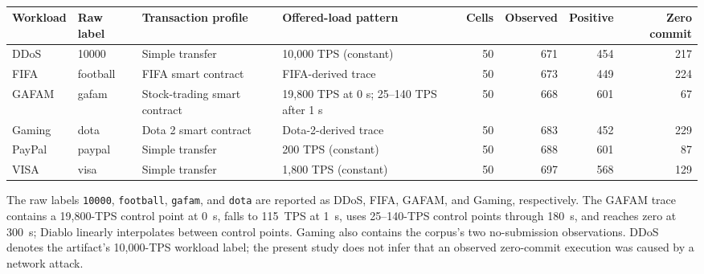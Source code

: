 \begin{table}[t]
\centering
\caption{}
\label{tab:six_workload_catalog}
\TableFont
\setlength{\tabcolsep}{3.2pt}
\setlength{\tabcolsep}{2pt}
\begin{tabular}{llllrrrr}
\hline
Workload & Raw label & Transaction profile & Offered-load pattern & Cells & Observed & Positive & Zero commit \\
\hline
DDoS & 10000 & Simple transfer & 10,000 TPS (constant) & 50 & 671 & 454 & 217 \\
FIFA & football & FIFA smart contract & FIFA-derived trace & 50 & 673 & 449 & 224 \\
GAFAM & gafam & Stock-trading smart contract & 19,800 TPS at 0 s; 25--140 TPS after 1 s & 50 & 668 & 601 & 67 \\
Gaming & dota & Dota 2 smart contract & Dota-2-derived trace & 50 & 683 & 452 & 229 \\
PayPal & paypal & Simple transfer & 200 TPS (constant) & 50 & 688 & 601 & 87 \\
VISA & visa & Simple transfer & 1,800 TPS (constant) & 50 & 697 & 568 & 129 \\
\hline
\end{tabular}
\vspace{1mm}
\parbox{\textwidth}{\TableFont The raw labels \texttt{10000}, \texttt{football}, \texttt{gafam}, and \texttt{dota} are reported as DDoS, FIFA, GAFAM, and Gaming, respectively. The GAFAM trace contains a 19,800-TPS control point at 0~s, falls to 115~TPS at 1~s, uses 25--140-TPS control points through 180~s, and reaches zero at 300~s; Diablo linearly interpolates between control points. Gaming also contains the corpus's two no-submission observations. DDoS denotes the artifact's 10,000-TPS workload label; the present study does not infer that an observed zero-commit execution was caused by a network attack.}
\end{table}
